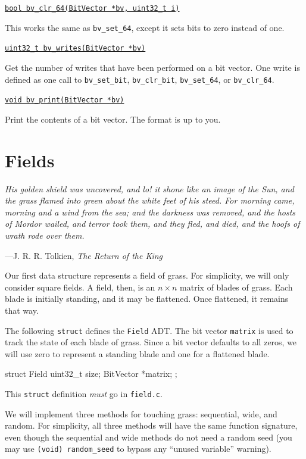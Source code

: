 \documentclass[11pt]{article}
\begin{document}
\underline{\texttt{bool bv\_clr\_64(BitVector *bv, uint32\_t i)}}

This works the same as \texttt{bv\_set\_64}, except it sets bits to zero instead of one.
\medskip

\underline{\texttt{uint32\_t bv\_writes(BitVector *bv)}}

Get the number of writes that have been performed on a bit vector. One write is defined as one call to \texttt{bv\_set\_bit}, \texttt{bv\_clr\_bit}, \texttt{bv\_set\_64}, or \texttt{bv\_clr\_64}.
\medskip

\underline{\texttt{void bv\_print(BitVector *bv)}}

Print the contents of a bit vector. The format is up to you.

\setlength{\parindent}{17pt}
\setlength{\parskip}{0pt plus1pt}

\section{Fields}

\epigraph{\emph{His golden shield was uncovered, and lo! it shone like an image of the Sun, and the grass flamed into green about the white feet of his steed. For morning came, morning and a wind from the sea; and the darkness was removed, and the hosts of Mordor wailed, and terror took them, and they fled, and died, and the hoofs of wrath rode over them.}}{---J. R. R. Tolkien, \emph{The Return of the King}}

\noindent
Our first data structure represents a field of grass. For simplicity, we will only consider square fields. A field, then, is an $n \times n$ matrix of blades of grass. Each blade is initially standing, and it may be flattened. Once flattened, it remains that way.

The following \texttt{struct} defines the \texttt{Field} ADT. The bit vector \texttt{matrix} is used to track the state of each blade of grass. Since a bit vector defaults to all zeros, we will use zero to represent a standing blade and one for a flattened blade.

\begin{clisting}{}
struct Field {
    uint32_t size;
    BitVector *matrix;
};
\end{clisting}

This \texttt{struct} definition \emph{must} go in \texttt{field.c}.

We will implement three methods for touching grass: sequential, wide, and random. For simplicity, all three methods will have the same function signature, even though the sequential and wide methods do not need a random seed (you may use \texttt{(void) random\_seed} to bypass any ``unused variable'' warning).
\end{document}
